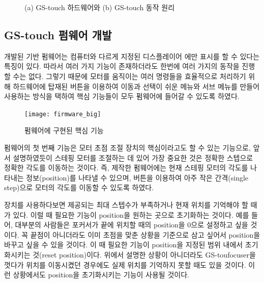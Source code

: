 \begin{figure}[H]
	\begin{center}
		\caption{(a) GS-touch 하드웨어와 (b) GS-touch 동작 원리}
	\label{fig:final_product_How_it_works_big}
	\end{center}
\end{figure}

\subsection{GS-touch 펌웨어 개발}

개발된 기반 펌웨어는 컴퓨터와 다르게 지정된 디스플레이어 에만 표시를 할 수 있다는 특징이 있다. 따라서 여러 가지 기능이 존재하더라도 한번에 여러 가지의 동작을 진행할 수는 없다. 그렇기 때문에 모터를 움직이는 여러 명령들을 효율적으로 처리하기 위해 하드웨어에 탑재된 버튼을 이용하여 이동과 선택이 쉬운 메뉴와 서브 메뉴를 만들어 사용하는 방식을 택하여 핵심 기능들이 모두 펌웨어에 들어갈 수 있도록 하였다.

\begin{figure}[h]
	\begin{center}
		\texttt{[image: firmware\_big]}
	\end{center}
	\caption{펌웨어에 구현된 핵심 기능}
	\label{fig:firmware_big}
\end{figure}

펌웨어의 첫 번째 기능은 모터 초점 조절 장치의 핵심이라고도 할 수 있는 기능으로, 앞서 설명하였듯이 스테핑 모터를 조절하는 데 있어 가장 중요한 것은 정확한 스텝으로 정확한 각도를 이동하는 것이다. 즉, 제작한 펌웨어에는 현재 스테핑 모터의 각도를 나타내는 정보(position)를 나타낼 수 있으며, 버튼을 이용하여 아주 작은 간격(single step)으로 모터의 각도를 이동할 수 있도록 하였다.

장치를 사용하다보면 제공되는 최대 스텝수가 부족하거나 현재 위치를 기억해야 할 때가 있다. 이럴 때 필요한 기능이 position을 원하는 곳으로 초기화하는 것이다. 예를 들어, 대부분의 사람들은 포커서가 끝에 위치할 때의 position을 0으로 설정하고 싶을 것이다. 꼭 끝점이 아니더라도 이미 초점을 맞춘 상황을 기준으로 삼고 싶어서 position을 바꾸고 싶을 수 있을 것이다. 이 때 필요한 기능이 position을 지정된 범위 내에서 초기화시키는 것(reset position)이다. 위에서 설명한 상황이 아니더라도 GS-toufocuser을 껏다가 위치를 이동시켰던 경우에도 실제 위치를 기억하지 못할 때도 있을 것이다. 이런 상황에서도 position을 초기화시키는 기능이 사용될 것이다.

